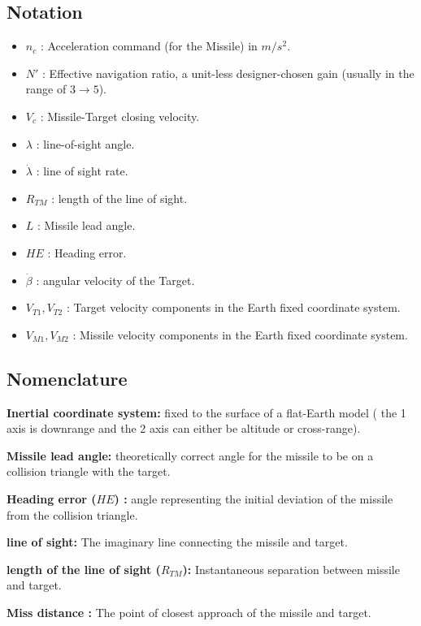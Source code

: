 \subsection*{Notation}
\begin{itemize}
	\item $n_c$ : Acceleration command (for the Missile) in $m/s^2$.
	\item $N'$ : Effective navigation ratio, a unit-less designer-chosen gain (usually in the range of $3\to5$).
	\item $V_c$ : Missile-Target closing velocity.
	\item $\lambda$ : line-of-sight angle.
	\item $\dot{\lambda}$ : line of sight rate.
	\item $R_{TM}$ : length of the line of sight.
	\item $L$ : Missile lead angle.
	\item $HE$ : Heading error.
	\item $\dot{\beta}$ : angular velocity of the Target.
	\item $V_{T1},V_{T2}$ : Target velocity components in the Earth fixed coordinate system.
	\item $V_{M1},V_{M2}$ : Missile velocity components in the Earth fixed coordinate system.
\end{itemize}
\subsection*{Nomenclature}

\textbf{Inertial coordinate system:} fixed to the surface of a flat-Earth model ( the 1 axis is downrange and the 2 axis can either be altitude or cross-range).

\textbf{Missile lead angle:} theoretically correct angle
for the missile to be on a collision triangle with the target.

\textbf{Heading error ($HE$) :} angle representing the initial deviation of the missile from the collision triangle.

\textbf{line of sight:} The imaginary line connecting the missile and target.

\textbf{length of the line of sight ($R_{TM}$):} Instantaneous separation between missile and target.

\textbf{Miss distance :} The point of closest approach of the missile and target.

